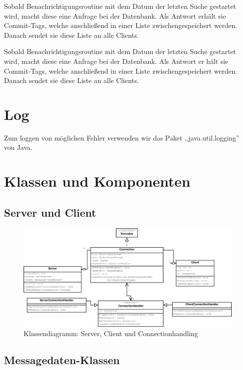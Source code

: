 Sobald Benachrichtigungsroutine mit dem Datum der letzten Suche gestartet wird, 
macht diese eine Anfrage bei der Datenbank. 
Als Antwort erhält sie Commit-Tags, welche anschließend in einer Liste zwischengespeichert werden. 
Danach sendet sie diese Liste an alle Clients. 

Sobald Benachrichtigungsroutine mit dem Datum der letzten Suche gestartet wird, macht diese eine Anfrage bei der Datenbank. Als Antwort er hält sie Commit-Tags, welche anschließend in einer Liste zwischengespeichert werden. Danach sendet sie diese Liste an alle Clients. 

\section{Log}
Zum loggen von möglichen Fehler verwenden wir das Paket ,,java.util.logging'' von Java.

\section{Klassen und Komponenten}

\subsection{Server und Client}
\liable{\eddy}
\begin{figure}[H]
	\centering
	\label{dia:design:frontend:classes:svcl}
	\includegraphics[width=\textwidth]{design/frontend/classes/Server-Client-Klassen.pdf}
	\caption{Klassendiagramm: Server, Client und Connectionhandling}
\end{figure}

\subsection{Messagedaten-Klassen}
\liable{\eddy}

